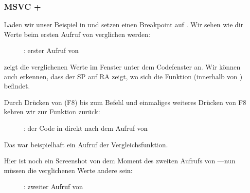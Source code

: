 \clearpage
\subsubsection{MSVC + \olly}
\myindex{\olly}
Laden wir unser Beispiel in \olly und setzen einen Breakpoint auf \comp.
Wir sehen wie dir Werte beim ersten Aufruf von \comp verglichen werden:

\begin{figure}[H]
\centering
{}
\caption{\olly: erster Aufruf von \comp}
\label{fig:qsort_olly1}
\end{figure}
\olly zeigt die verglichenen Werte im Fenster unter dem Codefenster an.
Wir können auch erkennen, dass der \ac{SP} auf \ac{RA} zeigt, wo sich die Funktion \qsort (innerhalb von
) befindet.

\clearpage
Durch Drücken von (F8) bis zum Befehl  und einmaliges weiteres Drücken von F8 kehren wir zur Funktion
\qsort zurück:

\begin{figure}[H]
\centering
{}
\caption{\olly: der Code in \qsort direkt nach dem Aufruf von \comp}
\label{fig:qsort_olly2}
\end{figure}

Das war beispielhaft ein Aufruf der Vergleichsfunktion.

\clearpage
Hier ist noch ein Screenshot von dem Moment des zweiten Aufrufs von \comp---nun müssen die verglichenen Werte andere
sein:

\begin{figure}[H]
\centering
{}
\caption{\olly: zweiter Aufruf von \comp}
\label{fig:qsort_olly3}
\end{figure}
